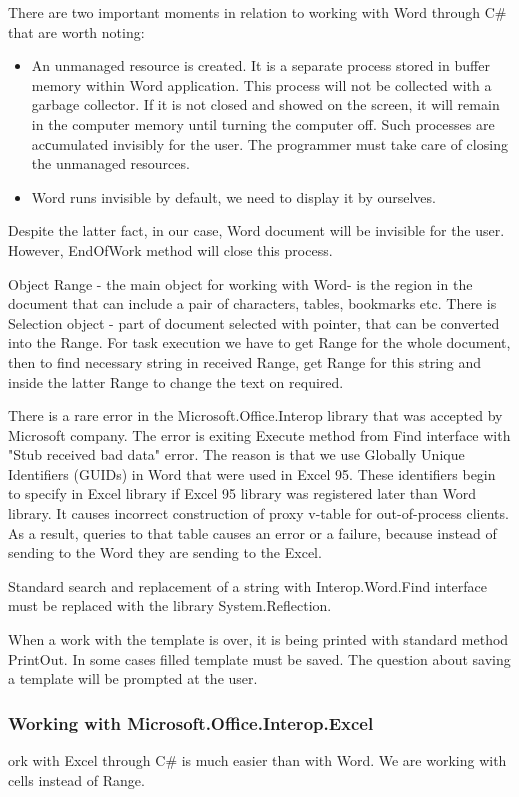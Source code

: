 \documentclass[12pt,journal,compsoc]{D:/Магистратура/English/bare_conf/IEEEtran}
\begin{document}
There are two important moments in relation to working with Word through C\# that are worth noting:
\begin{itemize}
\item An unmanaged resource is created. It is a separate process stored in buffer memory within Word application. This process will not be collected with a garbage collector. If it is not closed and showed on the screen, it will remain in the computer memory until turning the computer off. Such processes are acсumulated invisibly for the user. The programmer must take care of closing the unmanaged resources.
\item Word runs invisible by default, we need to display it by ourselves.
\end{itemize}

Despite the latter fact, in our case, Word document will be invisible for the user. However, EndOfWork method will close this process.

Object Range - the main object for working with Word- is the region in the document that can include a pair of characters, tables, bookmarks etc. There is Selection object - part of document selected with pointer, that can be converted into the Range. For task execution we have to get Range for the whole document, then to find necessary string in received Range, get Range for this string and inside the latter Range to change the text on required.

There is a rare error in the Microsoft.Office.Interop library that was accepted by Microsoft company. The error is exiting Execute method from Find interface with "Stub received bad data" error. The reason is that we use Globally Unique Identifiers (GUIDs) in Word that were used in Excel 95. These identifiers begin to specify in Excel library if Excel 95 library was registered later than Word library. It causes  incorrect construction of proxy v-table for out-of-process clients. As a result, queries to that table causes an error or a failure, because instead of sending to the Word they are sending to the Excel.

Standard search and replacement of a string with Interop.Word.Find interface must be replaced with the library System.Reflection.

When a work with the template is over, it is being printed with standard method PrintOut. In some cases filled template must be saved. The question about saving a template will be prompted at the user.

\subsubsection{Working with Microsoft.Office.Interop.Excel}
ork with Excel through C\# is much easier than with Word. We are working with cells instead of Range.
\end{document}

